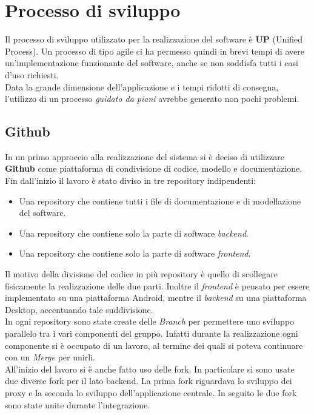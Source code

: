 \chapter{Processo di sviluppo}
Il processo di sviluppo utilizzato per la realizzazione del software è \textbf{UP} (Unified Process). Un processo di tipo agile ci ha permesso quindi in brevi tempi di avere un'implementazione funzionante del software, anche se non soddisfa tutti i casi d'uso richiesti.
\\Data la grande dimensione dell'applicazione e i tempi ridotti di consegna, l'utilizzo di un processo \textit{guidato da piani} avrebbe generato non pochi problemi.

\section{Github}
In un primo approccio alla realizzazione del sistema si è deciso di utilizzare \textbf{Github} come piattaforma di condivisione di codice, modello e documentazione. Fin dall'inizio il lavoro è stato diviso in tre repository indipendenti:
\begin{itemize}
	\item Una repository che contiene tutti i file di documentazione e di modellazione del software.
	\item Una repository che contiene solo la parte di software \textit{backend}. 
	\item Una repository che contiene solo la parte di software \textit{frontend}.
\end{itemize}
Il motivo della divisione del codice in più repository è quello di scollegare fisicamente la realizzazione delle due parti. Inoltre il \textit{frontend} è pensato per essere implementato su una piattaforma Android, mentre il \textit{backend} su una piattaforma Desktop, accentuando tale suddivisione.
\\In ogni repository sono state create delle \textit{Branch} per permettere uno sviluppo parallelo tra i vari componenti del gruppo. Infatti durante la realizzazione ogni componente si è occupato di un lavoro, al termine dei quali si poteva continuare con un \textit{Merge} per unirli.
\\All’inizio del lavoro si è anche fatto uso delle fork.
In particolare si sono usate due diverse fork per il lato backend.
La prima fork riguardava lo sviluppo dei proxy e la seconda lo sviluppo dell’applicazione centrale.
In seguito le due fork sono state unite durante l’integrazione.

